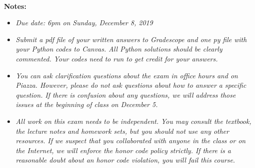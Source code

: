 \documentclass[12pt]{article}
\theoremstyle{remark}
\begin{document}
\renewcommand{\headrulewidth}{0.5pt}

\phantom{Test}
\noindent
{\bf \\ Notes:}
\begin{itemize}
\item {\em Due date: 6pm on Sunday, December 8, 2019}
\vspace{-2mm}
\item {\em Submit a pdf file of your written answers to Gradescope and one py file with your Python codes to Canvas. All Python solutions should be clearly commented. Your codes need to run to get credit for your answers.}
\vspace{-2mm}
\item {\em You can ask clarification questions about the exam in office hours and on Piazza. However, please do not ask questions about how to answer a specific question. If there is confusion about any questions, we will address those issues at the beginning of class on December 5.}
\vspace{-2mm}
\item {\em All work on this exam needs to be independent. You may consult the textbook, the lecture notes and homework sets, but you should not use any other resources. If we suspect that you collaborated with anyone in the class or on the Internet, we will enforce the honor code policy strictly. If there is a reasonable doubt about an honor code violation,  you will fail this course.}
\end{itemize}

\hrulefill
\end{document}
